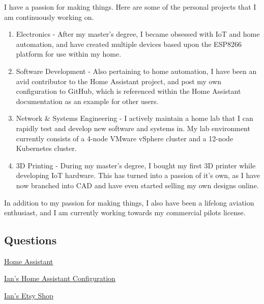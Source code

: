 I have a passion for making things. Here are some of the personal projects that I am continuously working on.
\begin{enumerate}
    \item {Electronics} - After my master's degree, I became obsessed with IoT and home automation, and have created multiple devices based upon the ESP8266 platform for use within my home.
    \item {Software Development} - Also pertaining to home automation, I have been an avid contributor to the Home Assistant \cite{home_assistant} project, and post my own configuration to GitHub, which is referenced within the Home Assistant documentation as an example for other users. \cite{home_assistant_config}
    \item {Network \& Systems Engineering} - I actively maintain a home lab that I can rapidly test and develop new software and systems in. My lab environment currently consists of a 4-node VMware vSphere cluster and a 12-node Kubernetes cluster.
    \item {3D Printing} - During my master's degree, I bought my first 3D printer while developing IoT hardware. This has turned into a passion of it's own, as I have now branched into CAD and have even started selling my own designs online. \cite{etsy_shop}
\end{enumerate}
In addition to my passion for making things, I also have been a lifelong aviation enthusiast, and I am currently working towards my commercial pilots license.

\subsection{Questions}


\medskip

\begin{thebibliography}{3}
\href{https://www.home-assistant.io/}{Home Assistant}

\href{https://github.com/Apocrathia/home-assistant-config}{Ian's Home Assistant Configuration}

\href{https://www.etsy.com/shop/Apocrathia}{Ian's Etsy Shop}

\end{thebibliography}